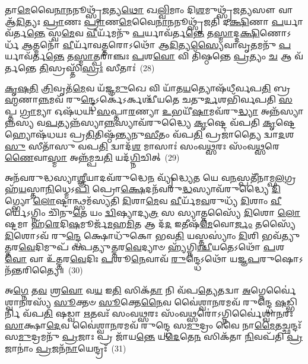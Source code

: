 𑌤𑌾\-\ul{𑌮𑍇}\-𑌵𑍈\-\ul{𑌨𑌾}\-𑌨𑌨𑍂𑌥𑍍𑌸𑍃᳴\-\ul{𑌜}\-𑌤𑍍𑌯\-\ul{𑌥𑍋} 𑌖\-\ul{𑌲𑍍𑌵𑌿}\-𑌮𑌾𑌂 𑌦𑌿\-\ul{𑌶}\-𑌮𑍁𑌥𑍍𑌸𑍃᳴𑌜\-\ul{𑌤𑍍𑌯}\-𑌸𑍗 𑌵𑌾 𑌆᳴\-\ul{𑌦𑌿}\-𑌤𑍍𑌯𑌃 \ul{𑌪𑍍𑌰𑌾}\-𑌣𑌃 \ul{𑌪𑍍𑌰𑌾}\-𑌣\-\ul{𑌮𑍇}\-𑌵𑍈\-\ul{𑌨𑌾}\-𑌨𑌨𑍂𑌥𑍍𑌸𑍃᳴𑌜𑌤𑌿 𑌦\-\ul{𑌕𑍍𑌷𑌿}\-𑌣𑌾 \ul{𑌪}\-𑌰𑍍𑌯𑌾𑌵᳴𑌰𑍍𑌤\-\ul{𑌨𑍍𑌤𑍇} 𑌸𑍍𑌵\-\ul{𑌮𑍇}\-𑌵 \ul{𑌵𑍀}\-𑌰𑍍𑌯᳴𑌮𑌨𑍁᳴ \ul{𑌪}\-𑌰𑍍𑌯𑌾𑌵᳴𑌰𑍍𑌤\-\ul{𑌨𑍍𑌤𑍇} 𑌤\-\ul{𑌸𑍍𑌮𑌾}\-𑌦𑍍𑌦\-\ul{𑌕𑍍𑌷𑌿}\-𑌣𑍋\-𑌽𑌰𑍍𑌧᳴ \ul{𑌆}\-𑌤𑍍𑌮𑌨𑍋᳴ \ul{𑌵𑍀}\-𑌰𑍍𑌯𑌾᳴𑌵\-\ul{𑌤𑍍𑌤}\-𑌰𑍋\-𑌽𑌥𑍋᳴ 𑌆\-\ul{𑌦𑌿}\-𑌤𑍍𑌯\-\ul{𑌸𑍍𑌯𑍈}\-𑌵𑌾𑌵𑍃\-\ul{𑌤}\-𑌮𑌨𑍁᳴ \ul{𑌪}\-𑌰𑍍𑌯𑌾𑌵᳴𑌰𑍍𑌤\-\ul{𑌨𑍍𑌤𑍇} 𑌤\-\ul{𑌸𑍍𑌮𑌾}\-𑌤𑍍𑌪𑌰𑌾॑𑌞𑍍𑌚𑌃 \ul{𑌪}\-𑌶\-\ul{𑌵𑍋} 𑌵𑌿 𑌤𑌿᳴𑌷𑍍𑌠𑌨𑍍𑌤𑍇 \ul{𑌪𑍍𑌰}\-𑌤𑍍𑌯𑌂 \ul{𑌚} 𑌆 𑌵᳴𑌰𑍍𑌤𑌨𑍍𑌤𑍇 \ul{𑌤𑌿}\-𑌸𑍍𑌰𑌸𑍍𑌤𑌿᳴\-\ul{𑌸𑍍𑌰𑌃} 𑌸𑍀𑌤𑌾𑌃॑~(28)

\-\ul{𑌕𑍃}\-\-\ul{𑌷}\-\-\ul{𑌤𑌿} \ul{𑌤𑍍𑌰𑌿}\-𑌵𑍃𑌤᳴\-\ul{𑌮𑍇}\-𑌵 𑌯᳴𑌜𑍍𑌞\-\ul{𑌮𑍁}\-𑌖𑍇 𑌵𑌿 𑌯𑌾᳴𑌤\-\ul{𑌯}\-𑌤𑍍𑌯𑍋𑌷᳴𑌧𑍀𑌰𑍍𑌵𑌪\-\ul{𑌤𑌿} 𑌬𑍍𑌰\-\ul{𑌹𑍍𑌮}\-𑌣𑌾\-\ul{𑌨𑍍𑌨}\-𑌮𑌵᳴ 𑌰𑍁\-\ul{𑌨𑍍𑌦𑍍𑌧𑍇}\-\-𑌽𑌰𑍍𑌕𑍇॑\-𑌽𑌰𑍍𑌕𑌶𑍍𑌚𑍀᳴𑌯𑌤𑍇 𑌚𑌤𑍁\-\ul{𑌰𑍍𑌦}\-𑌶𑌭𑌿᳴𑌰𑍍𑌵𑌪𑌤𑌿 \ul{𑌸}\-𑌪𑍍𑌤 \ul{𑌗𑍍𑌰𑌾}\-𑌮𑍍𑌯𑌾 𑌓𑌷᳴𑌧𑌯𑌃 \ul{𑌸}\-𑌪𑍍𑌤𑌾\-\ul{𑌰}\-𑌣𑍍𑌯𑌾 \ul{𑌉}\-𑌭𑌯𑍀᳴\-\ul{𑌷𑌾}\-𑌮𑌵᳴𑌰𑍁\-\ul{𑌦𑍍𑌧𑍍𑌯𑌾} 𑌅𑌨𑍍𑌨᳴𑌸𑍍𑌯𑌾𑌨𑍍𑌨𑌸𑍍𑌯 𑌵\-\ul{𑌪}\-𑌤𑍍𑌯𑌨𑍍𑌨᳴𑌸𑍍𑌯𑌾\-\ul{𑌨𑍍𑌨}\-𑌸𑍍𑌯𑌾𑌵᳴𑌰𑍁𑌦𑍍𑌧𑍍𑌯𑍈 \ul{𑌕𑍃}\-𑌷𑍍𑌟𑍇 𑌵᳴𑌪𑌤𑌿 \ul{𑌕𑍃}\-𑌷𑍍𑌟𑍇 𑌹𑍍𑌯𑍋𑌷᳴𑌧𑌯𑌃 𑌪𑍍𑌰\-\ul{𑌤𑌿}\-𑌤𑌿𑌷𑍍𑌠᳴𑌨𑍍𑌤𑍍𑌯𑌨𑍁\-\ul{𑌸𑍀}\-𑌤𑌂 𑌵᳴𑌪\-\ul{𑌤𑌿} 𑌪𑍍𑌰𑌜𑌾॑𑌤𑍍𑌯𑍈 𑌦𑍍𑌵𑌾\-\ul{𑌦}\-𑌶\-\ul{𑌸𑍁} 𑌸𑍀𑌤𑌾᳴𑌸𑍁 𑌵𑌪\-\ul{𑌤𑌿} 𑌦𑍍𑌵𑌾𑌦᳴\-\ul{𑌶} 𑌮𑌾𑌸𑌾𑌃॑ 𑌸𑌂𑌵\-\ul{𑌥𑍍𑌸}\-𑌰𑌃 𑌸𑌂᳴𑌵\-\ul{𑌥𑍍𑌸}\-𑌰𑍇\-\ul{𑌣𑍈}\-𑌵𑌾\-\ul{𑌸𑍍𑌮𑌾} 𑌅𑌨𑍍𑌨᳴𑌮𑍍𑌪𑌚\-\ul{𑌤𑌿} 𑌯𑌦᳴\-\ul{𑌗𑍍𑌨𑌿}\-𑌚𑌿𑌤𑍍~(29)

𑌅𑌨᳴𑌵𑌰𑍁𑌦𑍍𑌧𑌸𑍍𑌯𑌾\-\ul{𑌶𑍍𑌞𑍀}\-𑌯𑌾𑌦𑌵᳴𑌰𑍁𑌦𑍍𑌧𑍇\-\ul{𑌨} 𑌵𑍍𑌯𑍃᳴𑌦𑍍𑌧𑍍𑌯𑍇\-\ul{𑌤} 𑌯𑍇 𑌵\-\ul{𑌨}\-𑌸𑍍𑌪𑌤𑍀᳴𑌨𑌾𑌮𑍍𑌫\-\ul{𑌲}\-𑌗𑍍𑌰𑌹᳴\-\ul{𑌯}\-𑌸𑍍𑌤𑌾\-\ul{𑌨𑌿}\-𑌧𑍍𑌮𑍇\-𑌽\-\ul{𑌪𑌿} 𑌪𑍍𑌰𑍋\-\ul{𑌕𑍍𑌷𑍇}\-𑌦𑌨᳴𑌵𑌰𑍁\-\ul{𑌦𑍍𑌧}\-𑌸𑍍𑌯𑌾𑌵᳴𑌰𑍁𑌦𑍍𑌧𑍍𑌯𑍈 \ul{𑌦𑌿}\-𑌗𑍍𑌭𑍍𑌯𑍋 \ul{𑌲𑍋}\-𑌷𑍍𑌟𑌾𑌨𑍍𑌥𑍍𑌸𑌮᳴𑌸𑍍𑌯𑌤𑌿 \ul{𑌦𑌿}\-𑌶𑌾\-\ul{𑌮𑍇}\-𑌵 \ul{𑌵𑍀}\-𑌰𑍍𑌯᳴𑌮\-\ul{𑌵}\-𑌰𑍁𑌧𑍍𑌯᳴ \ul{𑌦𑌿}\-𑌶𑌾𑌂 \ul{𑌵𑍀}\-𑌰𑍍𑌯𑍇॑\-𑌽𑌗𑍍𑌨𑌿𑌂 𑌚𑌿᳴𑌨𑍁\-\ul{𑌤𑍇} 𑌯𑌂 \ul{𑌦𑍍𑌵𑌿}\-𑌷𑍍𑌯𑌾𑌦𑍍𑌯\-\ul{𑌤𑍍𑌰} 𑌸 𑌸𑍍𑌯𑌾𑌤𑍍𑌤𑌸𑍍𑌯𑍈᳴ \ul{𑌦𑌿}\-𑌶𑍋 \ul{𑌲𑍋}\-𑌷𑍍𑌟𑌮𑌾 𑌹᳴\-\ul{𑌰𑍇}\-𑌦𑌿\-\ul{𑌷}\-𑌮𑍂𑌰𑍍𑌜᳴\-\ul{𑌮}\-𑌹\-\ul{𑌮𑌿}\-𑌤 𑌆 𑌦᳴\-\ul{𑌦} 𑌇𑌤𑍀𑌷᳴\-\ul{𑌮𑍇}\-𑌵𑍋\-\ul{𑌰𑍍𑌜𑌂} 𑌤𑌸𑍍𑌯𑍈᳴ \ul{𑌦𑌿}\-𑌶𑍋\-𑌽𑌵᳴ 𑌰𑍁\-\ul{𑌨𑍍𑌦𑍍𑌧𑍇} 𑌕𑍍𑌷𑍋𑌧𑍁᳴𑌕𑍋 𑌭𑌵\-\ul{𑌤𑌿} 𑌯𑌸𑍍𑌤𑌸𑍍𑌯𑌾𑌂॑ \ul{𑌦𑌿}\-𑌶𑌿 𑌭𑌵᳴𑌤𑍍𑌯𑍁𑌤𑍍𑌤𑌰\-\ul{𑌵𑍇}\-𑌦𑌿𑌮𑍁𑌪᳴ 𑌵𑌪𑌤𑍍𑌯𑍁𑌤𑍍𑌤𑌰\-\ul{𑌵𑍇}\-𑌦𑍍𑌯𑌾𑍞 𑌹𑍍𑌯᳴𑌗𑍍𑌨𑌿\-\ul{𑌶𑍍𑌚𑍀}\-𑌯𑌤𑍇\-𑌽𑌥𑍋᳴ \ul{𑌪}\-𑌶\-\ul{𑌵𑍋} 𑌵𑌾 𑌉᳴𑌤𑍍𑌤𑌰\-\ul{𑌵𑍇}\-𑌦𑌿𑌃 \ul{𑌪}\-𑌶𑍂\-\ul{𑌨𑍇}\-𑌵𑌾𑌵᳴ \ul{𑌰𑍁}\-𑌨𑍍𑌦𑍍𑌧𑍇\-𑌽𑌥𑍋᳴ 𑌯𑌜𑍍𑌞\-\ul{𑌪}\-𑌰𑍁𑌷𑍋\-𑌽𑌨᳴𑌨𑍍𑌤𑌰𑌿𑌤𑍍𑌯𑍈॥~(30)

{\anuvakamend[{\-\ul{𑌚} \ul{𑌭}\-\-\ul{𑌵}\-\-\ul{𑌤𑍍𑌯𑍇}\-𑌤𑌾\-\ul{𑌵}\-𑌦𑍍𑌵𑍈 𑌪𑍁𑌰𑍁᳴𑌷𑍇 \ul{𑌵𑍀}\-𑌰𑍍𑌯𑌂᳴ 𑌯\-\ul{𑌤𑍍𑌕𑍃}\-𑌷𑍍𑌟𑌞𑍍𑌚𑌾𑌕𑍃᳴𑌷𑍍𑌟𑌂 \ul{𑌚} 𑌦𑌿𑌖𑍍𑌸𑍀𑌤𑌾᳴ 𑌅\-\ul{𑌗𑍍𑌨𑌿}\-𑌚𑌿𑌦\-\ul{𑌵} 𑌪𑌞𑍍𑌚᳴𑌵𑌿𑍞𑌶𑌤𑌿𑌶𑍍𑌚}]}%

𑌅\-\ul{𑌗𑍍𑌨𑍇} 𑌤\-\ul{𑌵} 𑌶𑍍𑌰\-\ul{𑌵𑍋} 𑌵\-\ul{𑌯} 𑌇\-\ul{𑌤𑌿} 𑌸𑌿𑌕᳴\-\ul{𑌤𑌾} 𑌨𑌿 𑌵᳴𑌪\-\ul{𑌤𑍍𑌯𑍇}\-𑌤𑌦𑍍𑌵𑌾 \ul{𑌅}\-𑌗𑍍𑌨𑍇𑌰𑍍𑌵𑍈॑𑌶𑍍𑌵𑌾\-\ul{𑌨}\-𑌰𑌸𑍍𑌯᳴ \ul{𑌸𑍂}\-𑌕𑍍𑌤𑍞 \ul{𑌸𑍂}\-𑌕𑍍𑌤𑍇\-\ul{𑌨𑍈}\-𑌵 𑌵𑍈॑𑌶𑍍𑌵𑌾\-\ul{𑌨}\-𑌰𑌮𑌵᳴ 𑌰𑍁𑌨𑍍𑌦𑍍𑌧𑍇 \ul{𑌷}\-𑌡𑍍𑌭𑌿𑌰𑍍𑌨𑌿 𑌵᳴𑌪\-\ul{𑌤𑌿} 𑌷𑌡𑍍𑌵𑌾 \ul{𑌋}\-𑌤𑌵𑌃᳴ 𑌸𑌂𑌵\-\ul{𑌥𑍍𑌸}\-𑌰𑌃 𑌸𑌂᳴𑌵\-\ul{𑌥𑍍𑌸}\-𑌰𑍋॑\-𑌽𑌗𑍍𑌨𑌿𑌰𑍍𑌵𑍈॑𑌶𑍍𑌵𑌾\-\ul{𑌨}\-𑌰𑌃 \ul{𑌸𑌾}\-𑌕𑍍𑌷𑌾\-\ul{𑌦𑍇}\-𑌵 𑌵𑍈॑𑌶𑍍𑌵𑌾\-\ul{𑌨}\-𑌰𑌮𑌵᳴ 𑌰𑍁𑌨𑍍𑌦𑍍𑌧𑍇 𑌸\-\ul{𑌮𑍁}\-𑌦𑍍𑌰𑌂 𑌵𑍈 𑌨𑌾\-\ul{𑌮𑍈}\-𑌤𑌚𑍍𑌛𑌨𑍍𑌦𑌃᳴ 𑌸\-\ul{𑌮𑍁}\-𑌦𑍍𑌰𑌮𑌨𑍁᳴ \ul{𑌪𑍍𑌰}\-𑌜𑌾𑌃 𑌪𑍍𑌰 𑌜𑌾᳴𑌯\-\ul{𑌨𑍍𑌤𑍇} 𑌯\-\ul{𑌦𑍇}\-𑌤𑍇\-\ul{𑌨} 𑌸𑌿𑌕᳴𑌤𑌾 \ul{𑌨𑌿}\-𑌵𑌪᳴𑌤𑌿 \ul{𑌪𑍍𑌰}\-𑌜𑌾𑌨𑌾𑌂॑ \ul{𑌪𑍍𑌰}\-𑌜𑌨᳴\-\ul{𑌨𑌾}\-𑌯𑍇𑌨𑍍𑌦𑍍𑌰𑌃᳴~(31)

